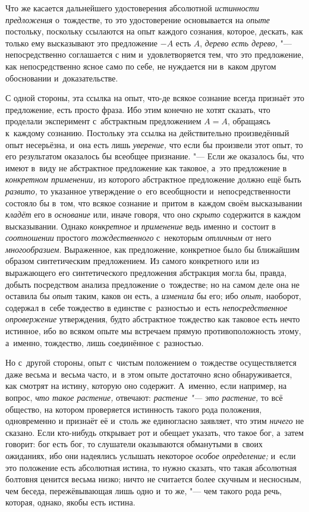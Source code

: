 Что же касается дальнейшего удостоверения абсолютной
{\em истинности предложения} о~тождестве, то это
удостоверение основывается на {\em опыте} постольку,
поскольку ссылаются на опыт каждого сознания, которое, дескать, как только
ему высказывают это предложение $-A$ есть $A$,
{\em дерево есть дерево,} "--- непосредственно соглашается
с ним и~удовлетворяется тем, что это предложение, как непосредственно ясное
само по себе, не нуждается ни в~каком другом обосновании и~доказательстве.

С одной стороны, эта ссылка на опыт, что-де всякое сознание всегда признаёт
это предложение, есть просто фраза. Ибо этим конечно не хотят сказать, что
проделали эксперимент с~абстрактным предложением $A=A$,
обращаясь к~каждому сознанию. Постольку эта ссылка на действительно
произведённый опыт несерьёзна, и~она есть лишь
{\em уверение,} что если бы произвели этот опыт, то его
результатом оказалось бы всеобщее признание. "--- Если же оказалось бы, что
имеют в~виду не абстрактное предложение как таковое, а~это предложение в
{\em конкретном применении,} из которого абстрактное
предложение должно ещё быть {\em развито,} то указанное
утверждение о~его всеобщности и~непосредственности состояло бы в~том, что
всякое сознание и~притом в~каждом своём высказывании
{\em кладёт} его в {\em основание}
или, иначе говоря, что оно {\em скрыто} содержится в
каждом высказывании. Однако {\em конкретное} и
{\em применение} ведь именно и~состоит в
{\em соотношении} простого
{\em тождественного} с~некоторым
{\em отличным} от него
{\em многообразием}. Выраженное, как предложение,
конкретное было бы ближайшим образом синтетическим предложением. Из самого
конкретного или из выражающего его синтетического предложения абстракция
могла бы, правда, добыть посредством анализа предложение о~тождестве; но на
самом деле она не оставила бы {\em опыт} таким, каков
он есть, а {\em изменила} бы его; ибо
{\em опыт,} наоборот, содержал в~себе тождество в
единстве с~разностью и~есть {\em непосредственное
опровержение} утверждения, будто абстрактное тождество как таковое есть
нечто истинное, ибо во всяком опыте мы встречаем прямую противоположность
этому, а~именно, тождество, лишь соединённое с~разностью.

Но с~другой стороны, опыт с~чистым положением о~тождестве осуществляется
даже весьма и~весьма часто, и~в этом опыте достаточно ясно обнаруживается,
как смотрят на истину, которую оно содержит. А~именно, если
например, на вопрос, {\em что такое растение,} отвечают:
{\em растение "--- это растение,} то всё общество,
на котором проверяется истинность такого рода положения, одновременно и
признаёт её и~столь же единогласно заявляет, что этим
{\em ничего} не сказано. Если кто-нибудь открывает рот
и обещает указать, что такое бог, а~затем говорит: бог есть бог, то
слушатели оказываются обманутыми в~своих ожиданиях, ибо они надеялись
услышать некоторое {\em особое определение;} и~если
это положение есть абсолютная истина, то нужно сказать, что такая
абсолютная болтовня ценится весьма низко; ничто не считается более скучным
и несносным, чем беседа, пережёвывающая лишь одно и~то же, "--- чем такого
рода речь, которая, однако, якобы есть истина.

